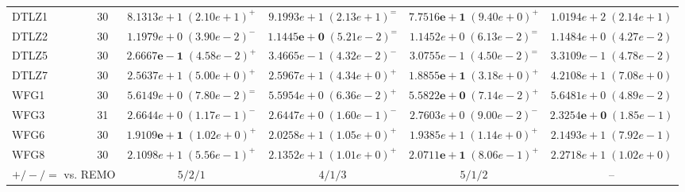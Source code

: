 \begin{table}[t]
\begin{tabular}{lccccc}
\midrule
DTLZ1 & 30 & $8.1313e+1\;(2.10e+1)^{+}$ & $9.1993e+1\;(2.13e+1)^{=}$ & $\mathbf{7.7516e+1}\;(9.40e+0)^{+}$ & $1.0194e+2\;(2.14e+1)$ \\
DTLZ2 & 30 & $1.1979e+0\;(3.90e-2)^{-}$ & $\mathbf{1.1445e+0}\;(5.21e-2)^{=}$ & $1.1452e+0\;(6.13e-2)^{=}$ & $1.1484e+0\;(4.27e-2)$ \\
DTLZ5 & 30 & $\mathbf{2.6667e-1}\;(4.58e-2)^{+}$ & $3.4665e-1\;(4.32e-2)^{-}$ & $3.0755e-1\;(4.50e-2)^{=}$ & $3.3109e-1\;(4.78e-2)$ \\
DTLZ7 & 30 & $2.5637e+1\;(5.00e+0)^{+}$ & $2.5967e+1\;(4.34e+0)^{+}$ & $\mathbf{1.8855e+1}\;(3.18e+0)^{+}$ & $4.2108e+1\;(7.08e+0)$ \\
WFG1 & 30 & $5.6149e+0\;(7.80e-2)^{=}$ & $5.5954e+0\;(6.36e-2)^{+}$ & $\mathbf{5.5822e+0}\;(7.14e-2)^{+}$ & $5.6481e+0\;(4.89e-2)$ \\
WFG3 & 31 & $2.6644e+0\;(1.17e-1)^{-}$ & $2.6447e+0\;(1.60e-1)^{-}$ & $2.7603e+0\;(9.00e-2)^{-}$ & $\mathbf{2.3254e+0}\;(1.85e-1)$ \\
WFG6 & 30 & $\mathbf{1.9109e+1}\;(1.02e+0)^{+}$ & $2.0258e+1\;(1.05e+0)^{+}$ & $1.9385e+1\;(1.14e+0)^{+}$ & $2.1493e+1\;(7.92e-1)$ \\
WFG8 & 30 & $2.1098e+1\;(5.56e-1)^{+}$ & $2.1352e+1\;(1.01e+0)^{+}$ & $\mathbf{2.0711e+1}\;(8.06e-1)^{+}$ & $2.2718e+1\;(1.02e+0)$ \\
\midrule
\multicolumn{2}{l}{$+/-/=$ vs. REMO} & $5/2/1$ & $4/1/3$ & $5/1/2$ & -- \\
\bottomrule
\end{tabular}
\end{table}
